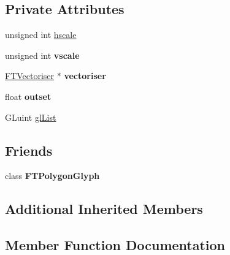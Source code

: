 \subsection*{Private Attributes}
\begin{DoxyCompactItemize}
\item 
unsigned int \hyperlink{class_f_t_polygon_glyph_impl_a934a24f5cd73f2adf3a5e4d94331cc02}{hscale}
\item 
unsigned int {\bfseries vscale}\hypertarget{class_f_t_polygon_glyph_impl_a198637eea909c182eac3c3b31468367a}{}\label{class_f_t_polygon_glyph_impl_a198637eea909c182eac3c3b31468367a}

\item 
\hyperlink{class_f_t_vectoriser}{F\+T\+Vectoriser} $\ast$ {\bfseries vectoriser}\hypertarget{class_f_t_polygon_glyph_impl_ac30689bb8ac64e4679ff22f004f0ce6b}{}\label{class_f_t_polygon_glyph_impl_ac30689bb8ac64e4679ff22f004f0ce6b}

\item 
float {\bfseries outset}\hypertarget{class_f_t_polygon_glyph_impl_ace4b2f90ff6fed607911eac656bc4d4d}{}\label{class_f_t_polygon_glyph_impl_ace4b2f90ff6fed607911eac656bc4d4d}

\item 
G\+Luint \hyperlink{class_f_t_polygon_glyph_impl_a3677d54bae624042c061bf78659dd0e7}{gl\+List}
\end{DoxyCompactItemize}
\subsection*{Friends}
\begin{DoxyCompactItemize}
\item 
class {\bfseries F\+T\+Polygon\+Glyph}\hypertarget{class_f_t_polygon_glyph_impl_a0e33f7bc34e1097f8f9adcb6252d1bc0}{}\label{class_f_t_polygon_glyph_impl_a0e33f7bc34e1097f8f9adcb6252d1bc0}

\end{DoxyCompactItemize}
\subsection*{Additional Inherited Members}


\subsection{Member Function Documentation}
